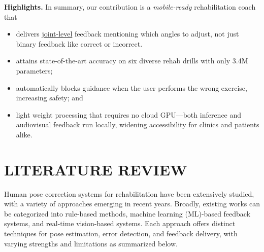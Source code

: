 \documentclass{article}
\begin{document}
\medskip
\textbf{Highlights.}  
In summary, our contribution is a \emph{mobile-ready} rehabilitation coach that  
\begin{itemize}
\item delivers \underline{joint-level} feedback mentioning which angles to adjust, not just binary feedback like correct or incorrect.
\item attains state-of-the-art accuracy on six diverse rehab drills with only 3.4M parameters;  
\item automatically blocks guidance when the user performs the wrong exercise, increasing safety; and  
\item light weight processing that requires no cloud GPU—both inference and audiovisual feedback run locally, widening accessibility for clinics and patients alike.  
\end{itemize}

\section{LITERATURE REVIEW}
Human pose correction systems for rehabilitation have been extensively studied, with a variety of approaches emerging in recent years. Broadly, existing works can be categorized into rule-based methods, machine learning (ML)-based feedback systems, and real-time vision-based systems. Each approach offers distinct techniques for pose estimation, error detection, and feedback delivery, with varying strengths and limitations as summarized below. 
\end{document}
